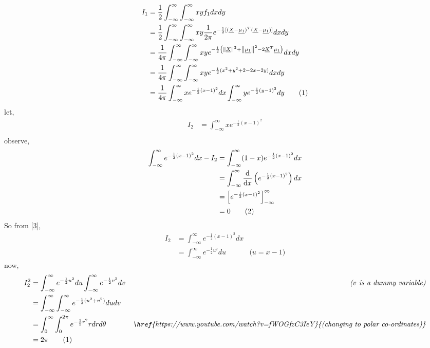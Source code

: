 \documentclass{article}
\theoremstyle{remark}
\renewcommand{\vec}[1]{\underline{#1}}
\newcommand\numberthis{\addtocounter{equation}{1}\tag{\theequation}}
\begin{document}
\begin{align*}
    I_1 &= \frac{1}{2} \int_{-\infty}^{\infty} \int_{-\infty}^{\infty} x y f_1 dx dy \\
    &= \frac{1}{2} \int_{-\infty}^{\infty} \int_{-\infty}^{\infty} x y \frac{1}{2\pi} e^{-\frac{1}{2}[(\vec{X}-\vec{\mu_1})^T(\vec{X}-\vec{\mu_1})]} dx dy \\
    &= \frac{1}{4\pi} \int_{-\infty}^{\infty} \int_{-\infty}^{\infty} x y e^{-\frac{1}{2}\left ( \left \| \vec{X} \right \|^2 + \left \| \vec{\mu_1} \right \|^2 -2 \vec{X}^T\vec{\mu_1} \right )} dx dy\\
    &= \frac{1}{4\pi} \int_{-\infty}^{\infty} \int_{-\infty}^{\infty} xye^{-\frac{1}{2}(x^2+y^2+2-2x-2y)} dx dy \\
    &= \frac{1}{4\pi} \int_{-\infty}^{\infty} x e^{-\frac{1}{2}(x-1)^2} dx \int_{-\infty}^{\infty} y e^{-\frac{1}{2}(y-1)^2}  dy \numberthis \label{2}\\
\end{align*}
let,
\begin{align*}
    I_2 &= \int_{-\infty}^{\infty} x e^{-\frac{1}{2}(x-1)^2}\\
\end{align*}
observe,
\begin{align*}
    \int_{-\infty}^{\infty} e^{-\frac{1}{2}(x-1)^2} dx - I_2 &= \int_{-\infty}^{\infty} (1-x) e^{-\frac{1}{2}(x-1)^2} dx\\
    &= \int_{-\infty}^{\infty} \frac{\mathrm{d}}{\mathrm{d} x}\left ( e^{-\frac{1}{2}(x-1)^2} \right ) dx \\
    &= \left [   e^{-\frac{1}{2}(x-1)^2} \right ]_{-\infty}^{\infty} \\
    &= 0 \numberthis \label{3}
\end{align*}
So from \eqref{3},
\begin{align*}
   I_2 &=  \int_{-\infty}^{\infty} e^{-\frac{1}{2}(x-1)^2} dx\\
   &= \int_{-\infty}^{\infty} e^{-\frac{1}{2}u^2} du &\textit{($u=x-1)$}
\end{align*}
now,
\begin{align*}
    I_2^2 &= \int_{-\infty}^{\infty} e^{-\frac{1}{2}u^2} du \int_{-\infty}^{\infty} e^{-\frac{1}{2}v^2} dv &\textit{($v$ is a dummy variable)}
    \\&= \int_{-\infty}^{\infty} \int_{-\infty}^{\infty} e^{-\frac{1}{2}(u^2+v^2)} du dv
    \\&=\int_{0}^{\infty} \int_{0}^{2\pi} e^{-\frac{1}{2}r^2} r dr d\theta &\textit{\href{https://www.youtube.com/watch?v=fWOGfzC3IeY}{(changing to polar co-ordinates)}}\\
    &= 2\pi \numberthis \label{4}
\end{align*}
\end{document}
